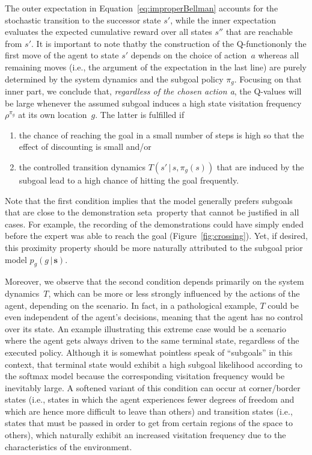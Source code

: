\documentclass[twoside,11pt]{article}
\newcommand{\first}{(i)}
\newcommand{\second}{(ii)}
\newcommand{\given}{\,\vert\,}
\newcommand{\ie}{i.e.}
\newcommand{\einschub}[1]{\Emdash*#1\Emdash*}
\newcommand{\nachschub}[1]{\Emdash*#1}
\begin{document}
The outer expectation in Equation~\eqref{eq:improperBellman} accounts for the stochastic transition to the successor state $s'$, while the inner expectation evaluates the expected cumulative reward over all states $s''$ that are reachable from $s'$.  
It is important to note that\einschub{by the construction of the Q-function}only the first move of the agent to state $s'$ %
depends on the choice of action~$a$ whereas all remaining moves (i.e., the argument of the expectation in the last line) are purely determined by the system dynamics and the subgoal policy $\pi_g$. Focusing on that inner part, %
we conclude that, \textit{regardless of the chosen action a}, the Q-values will be large whenever the assumed subgoal induces %
a high state visitation frequency~$\rho^{\pi_g}$ at its own location~$g$. The latter is fulfilled if 
\begin{enumerate}[topsep=-\parskip+1.5ex, itemsep=1ex, parsep=0mm]
\item[\first] the chance of reaching the goal in a small number of steps is high so that the effect of discounting is small and/or
\item[\second] the controlled transition dynamics	%
 $T(s'\given s, \pi_g(s))$ that are induced by the subgoal %
lead to a high chance of hitting the goal frequently.
\end{enumerate}
Note that the first condition implies that the model generally prefers subgoals that are close to the demonstration set\nachschub{a~\mbox{property} that cannot be justified in all cases}. For example, the recording of the demonstrations could have simply ended before the expert was able to reach the goal (Figure~\ref{fig:crossing}). Yet, if desired, this proximity property %
should be more naturally attributed to the subgoal prior model $p_g(g\given \mathbf{s})$. 

Moreover, we observe that the second condition depends primarily on %
the system dynamics~$T$, which can be more or less strongly influenced by the actions of the agent, depending on the scenario. In fact, in a pathological example, $T$ could be even independent of the agent's decisions, meaning that the agent has no control over its state. An example illustrating this extreme case would be a scenario where the agent gets always driven to the same terminal state, regardless of the executed policy. Although it is somewhat pointless %
speak of ``subgoals'' in this context, that terminal state would exhibit a high subgoal likelihood according to the softmax model because the corresponding visitation frequency  would be inevitably large. A %
softened variant of this condition %
can occur at corner/border states (\ie, states in which the agent %
experiences fewer degrees of freedom and which are hence more difficult to leave than others) 
and transition states (\ie, states that must be passed in order to get from certain regions of the space to others), which naturally exhibit an increased visitation frequency due to the characteristics of the environment.
\end{document}
